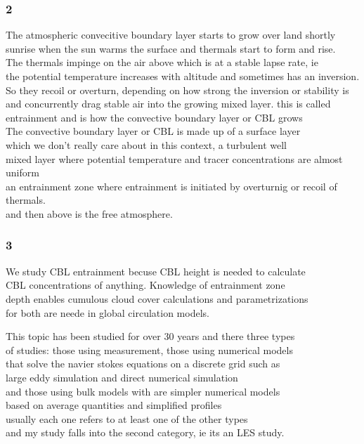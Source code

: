 \documentclass{beamer}
\newcommand\FrameText[1]{
\begin{textblock}{16}(1,2.5)
\raggedright #1
\end{textblock}}
\begin{document}
\begin{frame}
\frametitle{2}
The atmospheric convecitive boundary layer starts to grow over land shortly\\
sunrise when the sun warms the surface and thermals start to form and rise.\\
The thermals impinge on the air above which is at a stable lapse rate, ie\\
the potential temperature increases with altitude and sometimes has an inversion.\\
So they recoil or overturn, depending on how strong the inversion or stability is
and concurrently drag stable air into the growing mixed layer.  this is called\\
entrainment and is how the convective boundary layer or CBL grows\\ 
The convective boundary layer or CBL is made up of a surface layer\\
which we don't really care about in this context, a turbulent well\\
mixed layer where potential temperature and tracer concentrations are almost uniform\\
an entrainment zone where entrainment is initiated by overturnig or recoil of thermals.\\
and then above is the free atmosphere.\\

\end{frame}


\begin{frame}
\frametitle{3}
We study CBL entrainment becuse CBL height is needed to calculate\\
CBL concentrations of anything.  Knowledge of entrainment zone \\
depth enables cumulous cloud cover calculations and parametrizations\\
for both are neede in global circulation models.\\
\end{frame}

\begin{frame}
This topic has been studied for over 30 years and there three types\\
of studies:  those using measurement, those using numerical models\\
that solve the navier stokes equations on a discrete grid such as\\
large eddy simulation and direct numerical simulation\\
and those using bulk models with are simpler numerical models\\
based on average quantities and simplified profiles\\
usually each one refers to at least one of the other types\\
and my study falls into the second category, ie its an LES study.
\end{frame}
\end{document}
